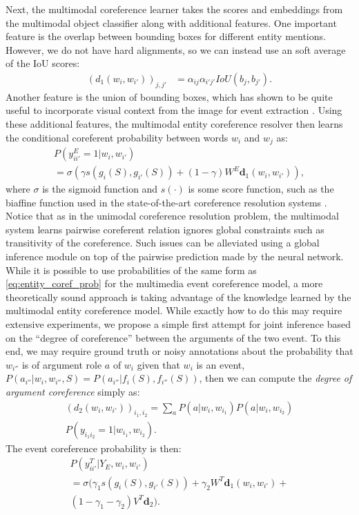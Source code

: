 \documentclass[11pt,a4paper]{article}
\begin{document}
Next, the multimodal coreference learner takes the scores and embeddings from the multimodal object classifier along with additional features. One important feature is  the overlap between bounding boxes for different entity mentions. However, we do not have hard alignments, so we can instead use an soft average of the IoU scores:
\begin{align}
    (d_1(w_i, w_{i'}))_{j, j'} &= \alpha_{ij}\alpha_{i'j'} IoU(b_j, b_{j'}). 
\end{align}
Another feature is the union of bounding boxes, which has shown to be quite useful to incorporate visual context from the image for event extraction \cite{Zhang2015-multimedia-coref}. Using these additional features, the multimodal entity coreference resolver then learns the conditional coreferent probability between words $w_i$ and $w_j$ as:
\begin{multline}\label{eq:entity_coref_prob}
    P(y_{ii'}^E=1|w_i, w_{i'}) \\
   = \sigma(\gamma s(g_i(S), g_{i'}(S)) + (1-\gamma)W^E \mathbf{d}_1(w_i, w_{i'})),
\end{multline}
where $\sigma$ is the sigmoid function and $s(\cdot)$ is some score function, such as the biaffine function used in the state-of-the-art coreference resolution systems \cite{Lee2017-neural-coref}. Notice that as in the unimodal coreference resolution problem, the multimodal system learns pairwise coreferent relation ignores global constraints such as transitivity of the coreference. Such issues can be alleviated using a global inference module on top of the pairwise prediction made by the neural network. While it is possible to use probabilities of the same form as \ref{eq:entity_coref_prob} for the multimedia event coreference model, a more theoretically sound approach is taking advantage of the knowledge learned by the multimodal entity coreference model. While exactly how to do this may require extensive experiments, we propose a simple first attempt for joint inference based on the ``degree of coreference'' between the arguments of the two event. To this end, we may require ground truth or noisy annotations about the probability that $w_{i''}$ is of argument role $a$ of $w_i$ given that $w_i$ is an event, $P(a_{i''}|w_i, w_{i''}, S) = P(a_{i''}|f_{i}(S), f_{i''}(S))$, then we can compute the \textit{degree of argument coreference} simply as:
\begin{multline}\label{eq:degree_of_arg_coref}
    (d_2(w_i, w_{i'}))_{i_1, i_2} = \sum_{a} P(a|w_{i}, w_{i_1}) P(a|w_{i}, w_{i_2}) \\ 
    P(y_{i_1i_2}=1|w_{i_1}, w_{i_2}).
\end{multline}
The event coreference probability is then:
\begin{multline}\label{eq:event_coref_prob}
    P(y_{ii'}^T|Y_E, w_i, w_{i'}) \\
    = \sigma(\gamma_1 s(g_i(S), g_{i'}(S)) + \gamma_2 W^T \mathbf{d}_1(w_i, w_{i'})+ \\(1-\gamma_1-\gamma_2) V^T \mathbf{d}_2). 
\end{multline}
\end{document}
